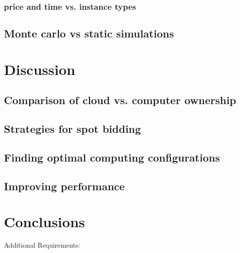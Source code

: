 \documentclass{frontiersSCNS} %
\begin{document}
\subsubsection{price and time vs. instance types}

\subsection{Monte carlo vs static simulations}



\section{Discussion}

\subsection{Comparison of cloud vs. computer ownership}

\subsection{Strategies for spot bidding}

\subsection{Finding optimal computing configurations}

\subsection{Improving performance}

\section{Conclusions}

Additional Requirements:
\end{document}
